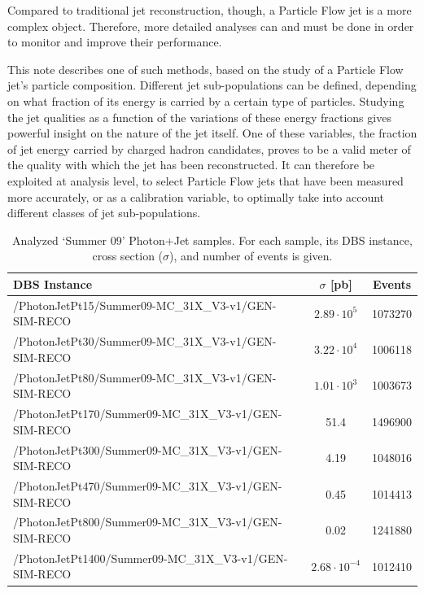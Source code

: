 \documentclass{cmspaper}
\begin{document}
Compared to traditional jet reconstruction, though, a Particle Flow jet is a more complex object. Therefore, more detailed analyses can and must be done in order to monitor and improve their performance.

This note describes one of such methods, based on the study of a Particle Flow jet's particle composition. Different jet sub-populations can be defined, depending on what fraction of its energy is carried by a certain type of particles. Studying the jet qualities as a function of the variations of these energy fractions gives powerful insight on the nature of the jet itself. One of these variables, the fraction of jet energy carried by charged hadron candidates, proves to be a valid meter of the quality with which the jet has been reconstructed. It can therefore be exploited at analysis level, to select Particle Flow jets that have been measured more accurately, or as a calibration variable, to optimally take into account different classes of jet sub-populations.


\begin{table}[tb]
\belowcaptionskip 0cm
\caption{Analyzed `Summer 09' Photon+Jet samples. For each sample, its DBS instance, cross section ($\sigma$), and number of events is given.}
\label{tab:dbs_photJet}
\begin{center}
\renewcommand{\baselinestretch}{0.8}
\small\normalsize
\begin{tabular}{lcc}
\hline
{\bf DBS Instance}& {\bf $\sigma$ [pb] } & {\bf Events} \\ 
\hline 
/PhotonJetPt15/Summer09-MC\_31X\_V3-v1/GEN-SIM-RECO   & $2.89 \cdot 10^5 $& 1073270 \\
/PhotonJetPt30/Summer09-MC\_31X\_V3-v1/GEN-SIM-RECO   & $3.22 \cdot 10^4$ & 1006118\\
/PhotonJetPt80/Summer09-MC\_31X\_V3-v1/GEN-SIM-RECO   & $1.01 \cdot 10^3$& 1003673\\
/PhotonJetPt170/Summer09-MC\_31X\_V3-v1/GEN-SIM-RECO  & 51.4 & 1496900\\
/PhotonJetPt300/Summer09-MC\_31X\_V3-v1/GEN-SIM-RECO  & 4.19& 1048016\\
/PhotonJetPt470/Summer09-MC\_31X\_V3-v1/GEN-SIM-RECO  & 0.45 & 1014413\\
/PhotonJetPt800/Summer09-MC\_31X\_V3-v1/GEN-SIM-RECO  & 0.02& 1241880\\
/PhotonJetPt1400/Summer09-MC\_31X\_V3-v1/GEN-SIM-RECO & $2.68 \cdot 10^{-4}$&  1012410\\
\hline
\end{tabular}
\end{center}
\end{table}
\end{document}
